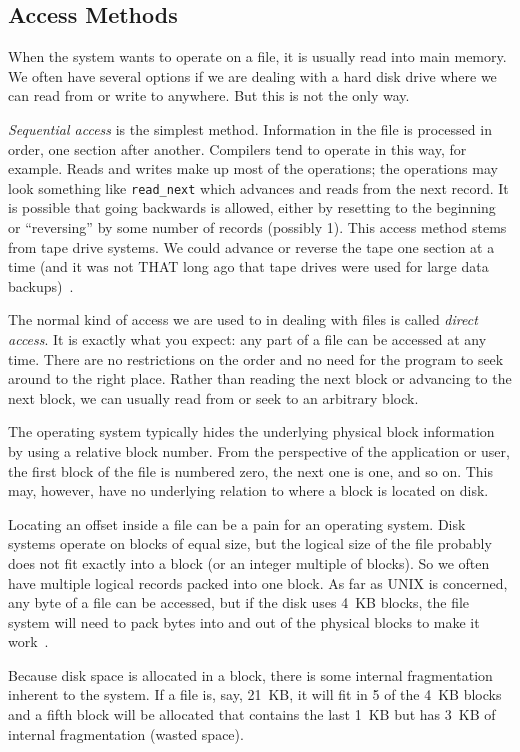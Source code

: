 \subsection*{Access Methods}

When the system wants to operate on a file, it is usually read into main memory. We often have several options if we are dealing with a hard disk drive where we can read from or write to anywhere. But this is not the only way.

\textit{Sequential access} is the simplest method. Information in the file is processed in order, one section after another. Compilers tend to operate in this way, for example. Reads and writes make up most of the operations; the operations may look something like \texttt{read\_next} which advances and reads from the next record. It is possible that going backwards is allowed, either by resetting to the beginning or ``reversing'' by some number of records (possibly 1). This access method stems from tape drive systems. We could advance or reverse the tape one section at a time (and it was not THAT long ago that tape drives were used for large data backups)~\cite{osc}.

The normal kind of access we are used to in dealing with files is called \textit{direct access}. It is exactly what you expect: any part of a file can be accessed at any time. There are no restrictions on the order and no need for the program to seek around to the right place. Rather than reading the next block or advancing to the next block, we can usually read from or seek to an arbitrary block. 

The operating system typically hides the underlying physical block information by using a relative block number. From the perspective of the application or user, the first block of the file is numbered zero, the next one is one, and so on. This may, however, have no underlying relation to where a block is located on disk.

Locating an offset inside a file can be a pain for an operating system. Disk systems operate on blocks of equal size, but the logical size of the file probably does not fit exactly into a block (or an integer multiple of blocks). So we often have multiple logical records packed into one block. As far as UNIX is concerned, any byte of a file can be accessed, but if the disk uses 4~KB blocks, the file system will need to pack bytes into and out of the physical blocks to make it work~\cite{osc}.

Because disk space is allocated in a block, there is some internal fragmentation inherent to the system. If a file is, say, 21~KB, it will fit in 5 of the 4~KB blocks and a fifth block will be allocated that contains the last 1~KB but has 3~KB of internal fragmentation (wasted space).

